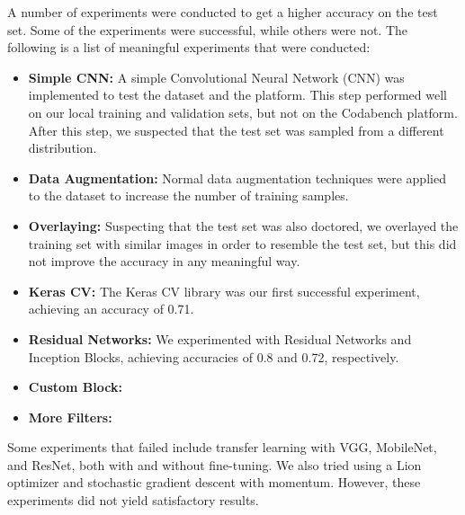 \documentclass[11pt]{article}
\begin{document}
\begin{multicols}{2}

    A number of experiments were conducted to get a higher accuracy on the test
    set. Some of the experiments were successful, while others were not. The
    following is a list of meaningful experiments that were conducted:

    \begin{itemize}
        \item \textbf{Simple CNN:} A simple Convolutional Neural Network (CNN)
              was implemented to test the dataset and the platform. This step
              performed well on our local training and validation sets, but not
              on the Codabench platform. After this step, we suspected that the
              test set was sampled from a different distribution.
        \item \textbf{Data Augmentation:} Normal data augmentation techniques
              were applied to the dataset to increase the number of training
              samples.
        \item \textbf{Overlaying:} Suspecting that the test set was also
              doctored, we overlayed the training set with similar images in
              order to resemble the test set, but this did not improve the
              accuracy in any meaningful way.
        \item \textbf{Keras CV:} The Keras CV library was our first successful
              experiment, achieving an accuracy of 0.71.
        \item \textbf{Residual Networks:} We experimented with Residual
              Networks and Inception Blocks, achieving accuracies of 0.8 and
              0.72, respectively.
        \item \textbf{Custom Block:}
        \item \textbf{More Filters:}
    \end{itemize}

    Some experiments that failed include transfer learning with VGG, MobileNet,
    and ResNet, both with and without fine-tuning. We also tried using a Lion
    optimizer and stochastic gradient descent with momentum. However, these
    experiments did not yield satisfactory results.


\end{multicols}
\end{document}
